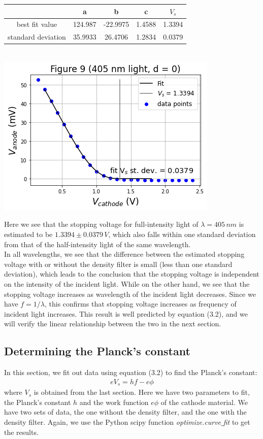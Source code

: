 \documentclass[11pt]{book}
\theoremstyle{break}
\theoremstyle{break}
\begin{document}
\begin{center}
\begin{tabular}{|c|c|c|c|c|}
\hline
 & a & b & c & $V_s$\\
\hline
best fit value & 124.987 & -22.9975 & 1.4588 & 1.3394 \\
\hline
standard deviation & 35.9933 & 26.4706 & 1.2834 & 0.0379 \\
\hline
\end{tabular}\\
\hfill\break
\hfill\break
\hfill\break
\includegraphics[scale=0.5]{fig9.png}
\end{center}
Here we see that the stopping voltage for full-intensity light of $\lambda = 405\, nm$ is estimated to be $1.3394\pm 0.0379\, V$, which also falls within one standard deviation from that of the half-intensity light of the same wavelength. \\

In all wavelengths, we see that the difference between the estimated stopping voltage with or without the density filter is small (less than one standard deviation), which leads to the conclusion that the stopping voltage is independent on the intensity of the incident light. While on the other hand, we see that the stopping voltage increases as wavelength of the incident light decreases. Since we have $f = 1/\lambda$, this confirms that stopping voltage increases as frequency of incident light increases. This result is well predicted by equation (3.2), and we will verify the linear relationship between the two in the next section. \\


\subsection{Determining the Planck's constant}
In this section, we fit out data using equation (3.2) to find the Planck's constant:
\begin{align*}
eV_s = hf - e\phi \tag{3.2}
\end{align*}
where $V_s$ is obtained from the last section. Here we have two parameters to fit, the Planck's constant $h$ and the work function $e\phi$ of the cathode material. We have two sets of data, the one without the density filter, and the one with the density filter. Again, we use the Python scipy function \textit{optimize.curve$\_$fit} to get the results. \\
\end{document}
